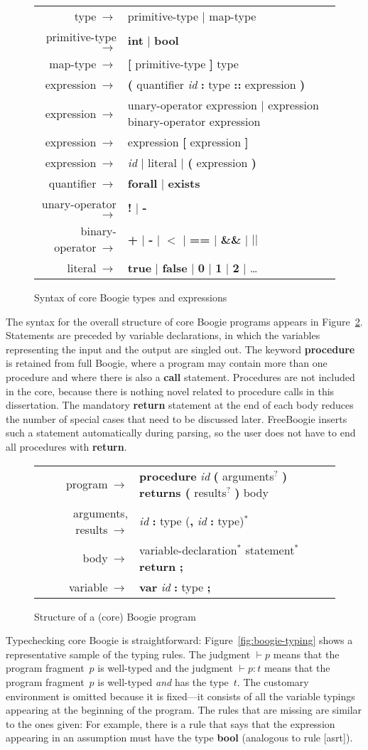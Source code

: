 \documentclass[a4paper]{article}
\newcommand{\startgrammar}{
  \begingroup
  \def\is{$\>\to$&}
  \def\|{$\mid$}
  \def\b##1{\textbf{##1}}
  \def\i##1{\textsl{##1}}
  \def\?{$^?$}
  \def\*{$^\ast$}
  \begin{figure}
  \centering
  \scriptsize
  \begin{tabular}{rl}
}
\newcommand{\stopgrammar}[2]{
  \end{tabular}
  \caption{#1}\label{#2}
  \end{figure}
  \endgroup
}
\theoremstyle{slanted}
\theoremstyle{definition}
\theoremstyle{remark}
\begin{document}
\startgrammar
  type\is primitive-type \| map-type \\
  primitive-type\is \b{int} \| \b{bool} \\
  map-type\is \b[ primitive-type \b] type \\
  expression\is \b( quantifier \i{id} \b: type \b{::} expression \b) \\
  expression\is unary-operator expression \| expression binary-operator expression \\
  expression\is expression \b[ expression \b] \\
  expression\is \i{id} \| literal \| \b( expression \b) \\
  quantifier\is \b{forall} \| \b{exists} \\
  unary-operator\is \b! \| \b- \\
  binary-operator\is \b+ \| \b- \| {\boldmath$<$} \| \b{==} \| \b{\&\&} \| {\boldmath$||$} \\
  literal\is \b{true} \| \b{false} \| \b0 \| \b1 \| \b2 \| \ldots \\
\stopgrammar{Syntax of core Boogie types and expressions}{grm:exprs-and-types}

The syntax for the overall structure of core Boogie programs
appears in Figure~\ref{grm:boogie}. Statements are preceded
by variable declarations, in which the variables representing
the input and the output are singled out. The keyword
\textbf{procedure} is retained from full Boogie, where a program
may contain more than one procedure and where there is also a
\textbf{call} statement. Procedures are not included in the core,
because there is nothing novel related to procedure calls in
this dissertation. The mandatory \textbf{return} statement at
the end of each body reduces the number of special cases that
need to be discussed later. FreeBoogie inserts such a statement
automatically during parsing, so the user does not have to end
all procedures with \textbf{return}.

\startgrammar
  program\is \b{procedure} \i{id} \b( arguments\? \b{) returns (} results\? \b) body \\
  arguments, results\is \i{id} \b: type (\b, \i{id} \b: type)\* \\
  body\is variable-declaration\* statement\* \b{return} \b; \\
  variable\is \b{var} \i{id} \b: type \b; \\
\stopgrammar{Structure of a (core) Boogie program}{grm:boogie}

Typechecking core Boogie is straightforward:
Figure~\ref{fig:boogie-typing} shows a representative sample of
the typing rules. The judgment $\vdash p$ means that the program
fragment~$p$ is well-typed and the judgment $\vdash p:t$ means
that the program fragment~$p$ is well-typed \emph{and} has the
type~$t$. The customary environment is omitted because it is
fixed---it consists of all the variable typings appearing at the
beginning of the program. The rules that are missing are similar
to the ones given: For example, there is a rule that says that
the expression appearing in an assumption must have the type
\textbf{bool} (analogous to rule [asrt]).
\end{document}
